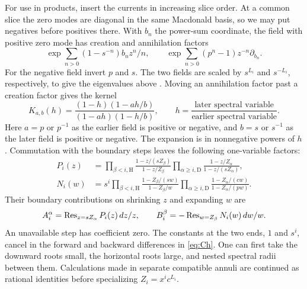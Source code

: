 For use in products, insert the currents in increasing slice order. At a common slice the zero modes are diagonal in the same Macdonald basis, so we may put negatives before positives there. With $b_n$ the power-sum coordinate, the field with positive zero mode has creation and annihilation factors
\[
 \exp\!\sum_{n>0}(1-s^{-n})b_n z^n/n,\qquad
 \exp\!\sum_{n>0}(p^n-1)z^{-n}\partial_{b_n}.
\]
For the negative field invert $p$ and $s$. The two fields are scaled by $s^{L_i}$ and $s^{-L_i}$, respectively, to give the eigenvalues above \cite[Propositions~2.6--2.7]{Ko}. Moving an annihilation factor past a creation factor gives the kernel
\begin{equation}\label{eq:K}
 K_{a,b}(h)=\frac{(1-h)(1-ah/b)}{(1-ah)(1-h/b)},\qquad
 h=\frac{\text{later spectral variable}}{\text{earlier spectral variable}} .
\end{equation}
Here $a=p$ or $p^{-1}$ as the earlier field is positive or negative, and $b=s$ or $s^{-1}$ as the later field is positive or negative. The expansion is in nonnegative powers of $h$. Commutation with the boundary steps leaves the following one-variable factors:
\begin{equation}\label{eq:onebody}
\begin{aligned}
 P_i(z)&=\prod_{\beta<i,\mathrm H}\frac{1-z/(s Z_\beta)}{1-z/Z_\beta}
          \prod_{\alpha\ge i,\mathrm D}\frac{1-z/Z_\alpha}{1-z/(sZ_\alpha)},\\
 N_i(w)&=s^i\prod_{\beta<i,\mathrm H}\frac{1-Z_\beta/(sw)}{1-Z_\beta/w}
          \prod_{\alpha\ge i,\mathrm D}\frac{1-Z_\alpha/(cw)}{1-Z_\alpha/(pw)} .
\end{aligned}
\end{equation}
Their boundary contributions on shrinking $z$ and expanding $w$ are
\[
 A_i^\alpha=\operatorname{Res}_{z=sZ_\alpha}P_i(z)\,dz/z,\qquad
 B_i^\beta=-\operatorname{Res}_{w=Z_\beta}N_i(w)\,dw/w .
\]
An unavailable step has coefficient zero. The constants at the two ends, $1$ and $s^i$, cancel in the forward and backward differences in \eqref{eq:Ch}. One can first take the downward roots small, the horizontal roots large, and nested spectral radii between them. Calculations made in separate compatible annuli are continued as rational identities before specializing $Z_i=x^ic^{L_i}$.

